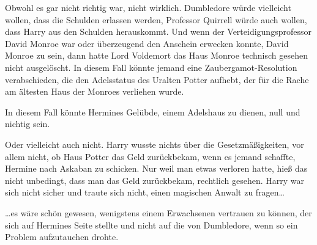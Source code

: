 Obwohl es gar nicht richtig war, nicht wirklich. Dumbledore würde vielleicht wollen, dass die Schulden erlassen werden, Professor Quirrell würde auch wollen, dass Harry aus den Schulden herauskommt. Und wenn der Verteidigungsprofessor David Monroe war oder überzeugend den Anschein erwecken konnte, David Monroe zu sein, dann hatte Lord Voldemort das Haus Monroe technisch gesehen nicht ausgelöscht. In diesem Fall könnte jemand eine Zaubergamot-Resolution verabschieden, die den Adelsstatus des Uralten Potter aufhebt, der für die Rache am ältesten Haus der Monroes verliehen wurde.

In diesem Fall könnte Hermines Gelübde, einem Adelshaus zu dienen, null und nichtig sein.

Oder vielleicht auch nicht. Harry wusste nichts über die Gesetzmäßigkeiten, vor allem nicht, ob Haus Potter das Geld zurückbekam, wenn es jemand schaffte, Hermine nach Askaban zu schicken. Nur weil man etwas verloren hatte, hieß das nicht unbedingt, dass man das Geld zurückbekam, rechtlich gesehen. Harry war sich nicht sicher und traute sich nicht, einen magischen Anwalt zu fragen…

…es wäre schön gewesen, wenigstens einem Erwachsenen vertrauen zu können, der sich auf Hermines Seite stellte und nicht auf die von Dumbledore, wenn so ein Problem aufzutauchen drohte.


